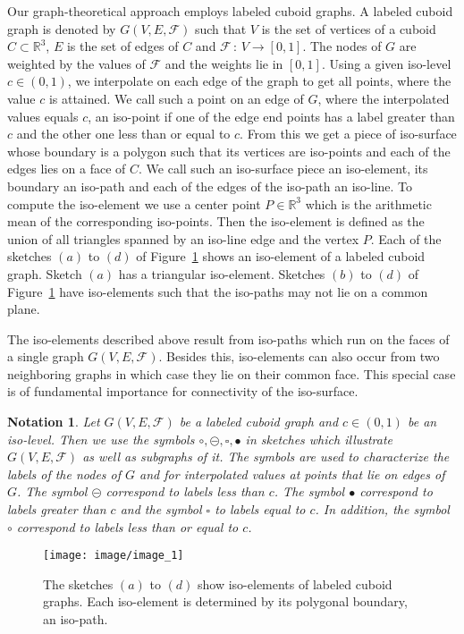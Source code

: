 \documentclass[a4paper,11pt]{article}
\newtheorem{notation}{Notation}
\begin{document}
Our graph-theoretical approach employs labeled cuboid graphs. A labeled cuboid graph is denoted by
$G(V,E,\mathcal{F})$ such that $V$ is the set of vertices of a cuboid  $C\subset\mathbb{R}^3$, $E$
is the set of edges of $C$ and $\mathcal{F}\,:\,V\rightarrow [0,1]$. The nodes of $G$ are weighted
by the values of $\mathcal{F}$ and the weights lie in $[0,1]$. Using a given iso-level $c\in (0,1)$,
we interpolate on each edge of the graph to get all points, where the value $c$ is attained.
We call such a point on an edge of $G$, where the interpolated values equals $c$, an iso-point if one
of the edge end points has a label greater than $c$ and the other one less than or equal to $c$. From
this we get a piece of iso-surface whose boundary is a polygon such that its vertices
are iso-points and each of the edges lies on a face of $C$. We call such an iso-surface piece an iso-element, its
boundary an iso-path and each of the edges of the iso-path an iso-line. To compute the iso-element we use
a center point $P\in\mathbb{R}^3$ which is the arithmetic mean of the corresponding iso-points.
Then the iso-element is defined as the union of all triangles spanned by an iso-line edge and the vertex $P$.
Each of the sketches $(a)$ to $(d)$ of Figure~\ref{image_1} shows an iso-element of a labeled
cuboid graph. Sketch $(a)$ has a triangular iso-element. Sketches $(b)$ to $(d)$ of
Figure~\ref{image_1} have iso-elements such that the iso-paths may not lie on a common plane.

The iso-elements described above result from iso-paths which run on the faces of a single graph $G(V,E,\mathcal{F})$.
Besides this, iso-elements can also occur from two neighboring graphs in which case they lie on their common
face. This special case is of fundamental importance for connectivity of the iso-surface.

\begin{notation}
Let $G(V,E,\mathcal{F})$ be a labeled cuboid graph and $c\in (0,1)$ be an iso-level. Then we use the symbols
$\circ,\circleddash,\square,\bullet$ in sketches which illustrate $G(V,E,\mathcal{F})$ as well as subgraphs
of it. The symbols are used to characterize the labels of the nodes of $G$ and for interpolated values at points
that lie on edges of $G$. The symbol $\circleddash$ correspond to labels less than $c$. The symbol $\bullet$
correspond to labels greater than $c$ and the symbol $\square$ to labels equal to $c$. In addition, the symbol
$\circ$ correspond to labels less than or equal to $c$.
\label{int:not-1}
\end{notation}
\begin{figure}[!ht]
\texttt{[image: image/image\_1]}
\caption{The sketches $(a)$ to $(d)$ show iso-elements of labeled cuboid graphs. Each iso-element
is determined by its polygonal boundary, an iso-path.}
\label{image_1}
\end{figure}
\FloatBarrier
\end{document}
